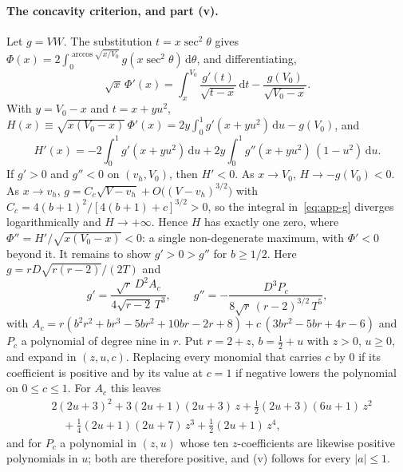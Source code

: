 \documentclass[12pt]{iopart}
\theoremstyle{plain}
\theoremstyle{definition}
\theoremstyle{remark}
\newcommand{\dd}{\mathrm{d}}
\begin{document}
\paragraph{The concavity criterion, and part (v).} Let $g=VW$. The substitution
$t=x\sec^2\theta$ gives $\Phi(x)=2\int_0^{\arccos\sqrt{x/V_0}}g(x\sec^2\theta)\,\dd\theta$,
and differentiating,
\begin{equation}
    \sqrt x\,\Phi'(x)=\int_x^{V_0}\frac{g'(t)}{\sqrt{t-x}}\,\dd t-\frac{g(V_0)}{\sqrt{V_0-x}} .
    \label{eq:app-g}
\end{equation}
With $y=V_0-x$ and $t=x+yu^2$, $H(x)\equiv\sqrt{x(V_0-x)}\,\Phi'(x)
=2y\int_0^1g'(x+yu^2)\,\dd u-g(V_0)$, and
\[
    H'(x)=-2\int_0^1g'(x+yu^2)\,\dd u+2y\int_0^1g''(x+yu^2)\,(1-u^2)\,\dd u .
\]
If $g'>0$ and $g''<0$ on $(v_h,V_0)$, then $H'<0$. As $x\to V_0$, $H\to-g(V_0)<0$. As
$x\to v_h$, $g=C_c\sqrt{V-v_h}+O\big((V-v_h)^{3/2}\big)$ with
$C_c=4(b+1)^2/[4(b+1)+c]^{3/2}>0$, so the integral in~\eqref{eq:app-g} diverges
logarithmically and $H\to+\infty$. Hence $H$ has exactly one zero, where
$\Phi''=H'/\sqrt{x(V_0-x)}<0$: a single non-degenerate maximum, with $\Phi'<0$ beyond it.
It remains to show $g'>0>g''$ for $b\ge1/2$. Here $g=rD\sqrt{r(r-2)}/(2T)$ and
\[
    g'=\frac{\sqrt r\,D^2A_c}{4\sqrt{r-2}\,T^3},\qquad
    g''=-\frac{D^3P_c}{8\sqrt r\,(r-2)^{3/2}\,T^5},
\]
with $A_c=r(b^2r^2+br^3-5br^2+10br-2r+8)+c\,(3br^2-5br+4r-6)$ and $P_c$ a polynomial of
degree nine in $r$. Put $r=2+z$, $b=\tfrac12+u$ with $z>0$, $u\ge0$, and expand in
$(z,u,c)$. Replacing every monomial that carries $c$ by $0$ if its coefficient is
positive and by its value at $c=1$ if negative lowers the polynomial on $0\le c\le1$. For
$A_c$ this leaves
\[
\begin{aligned}
    &2(2u+3)^2+3(2u+1)(2u+3)\,z+\tfrac12(2u+3)(6u+1)\,z^2\\
    &\quad+\tfrac14(2u+1)(2u+7)\,z^3+\tfrac12(2u+1)\,z^4 ,
\end{aligned}
\]
and for $P_c$ a polynomial in $(z,u)$ whose ten $z$-coefficients are likewise positive
polynomials in $u$; both are therefore positive, and (v) follows for every $|a|\le1$.
\end{document}
